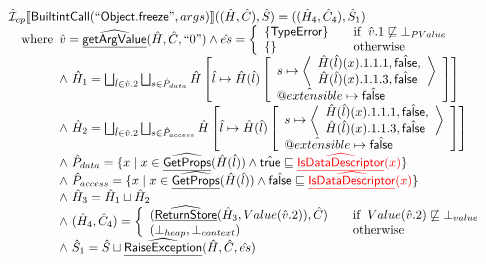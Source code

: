 \[\begin{array}{ll}
\aI _{cp}\lbr \SF{BuiltintCall}(``\SF{Object.freeze}",args)\rbr((\hat{H},\hat{C}), \hat{S})
  = ((\hat{H}_4, \hat{C}_4), \hat{S}_1)\\
\quad\wherec{
 \hat{v} =\ahf{getArgValue}(\hat{H}, \hat{C}, ``0")
  \land \hat{es} =
    \left\{
    \begin{array}{l@{\quad\quad}l}
      \{ \SF{TypeError} \} & \ifc{\hat{v}.1 \not\sqsubseteq \bot_{PValue}}\\
      \{ \}& \owc\\
    \end{array}
    \right.\\
  \land\ \hat{H}_1 = \bigsqcup_{\hat{l} \in \hat{v}.2}
    \bigsqcup_{s \in \hat{P}_{data}} \hat{H}  
    \left[\hat{l} \mapsto \hat{H}(\hat{l})
      \left[\begin{array}{l}
        s \mapsto 
        \left\langle\begin{array}{l}
          \hat{H}(\hat{l})(x).1.1.1, \afalse,\\
          \hat{H}(\hat{l})(x).1.1.3, \afalse 
        \end{array}\right\rangle\\
      \avarprop{extensible} \mapsto \afalse
      \end{array}\right]\right]\\
  \land\ \hat{H}_2 = \bigsqcup_{\hat{l} \in \hat{v}.2}
    \bigsqcup_{s \in \hat{P}_{access}} \hat{H}  
    \left[\hat{l} \mapsto \hat{H}(\hat{l})
      \left[\begin{array}{l}
        s \mapsto 
        \left\langle\begin{array}{l}
          \hat{H}(\hat{l})(x).1.1.1, \afalse,\\
          \hat{H}(\hat{l})(x).1.1.3, \afalse 
        \end{array}\right\rangle\\
      \avarprop{extensible} \mapsto \afalse
      \end{array}\right]\right]\\
  \land\ \hat{P}_{data} =
    \{ x \mid x \in \ahf{GetProps}(\hat{H}(\hat{l})) \land \atrue \sqsubseteq {\inred \ahf{IsDataDescriptor}(x)}\}\\
  \land\ \hat{P}_{access} =
    \{ x \mid x \in \ahf{GetProps}(\hat{H}(\hat{l})) \land \afalse \sqsubseteq {\inred \ahf{IsDataDescriptor}(x)}\}\\  
  \land\ \hat{H}_3 = \hat{H}_1 \sqcup \hat{H}_2\\
  \land\ (\hat{H}_4, \hat{C}_4) = 
    \left\{\begin{array}{l@{\quad\quad}l}
      (\ahf{ReturnStore}(\hat{H}_3, Value(\hat{v}.2)), \hat{C})
      & \ifc{Value(\hat{v}.2) \not\sqsubseteq \bot_{value}}\\
      (\bot_{heap}, \bot_{context}) & \owc \\
    \end{array}\right.\\
  \land\ \hat{S}_1 = \hat{S} \sqcup \ahf{RaiseException}(\hat{H}, \hat{C}, \hat{es})\\
  }\\
\\\\ 




\end{array}\]
